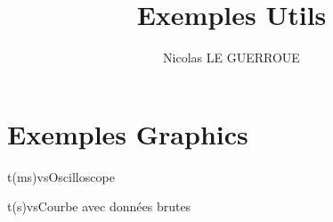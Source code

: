 \documentclass[12pt]{article}
\begin{document}
\title{Exemples Utils}
\author{Nicolas LE GUERROUE}
\maketitle
\tableofcontents
\newpage

\section{Exemples Graphics}


\begin{exemple}
\begin{graphics}{0.8}{0.6}{0}{2.1}{-1.1}{1.1}{t(ms)}{vs}{Oscilloscope}
\end{graphics}
\end{exemple}


\begin{exemple}
\begin{graphics}{0.8}{0.4}{0}{40}{-1}{6}{t(s)}{vs}{Courbe avec données brutes}
\end{graphics}
\end{exemple}
\end{document}
